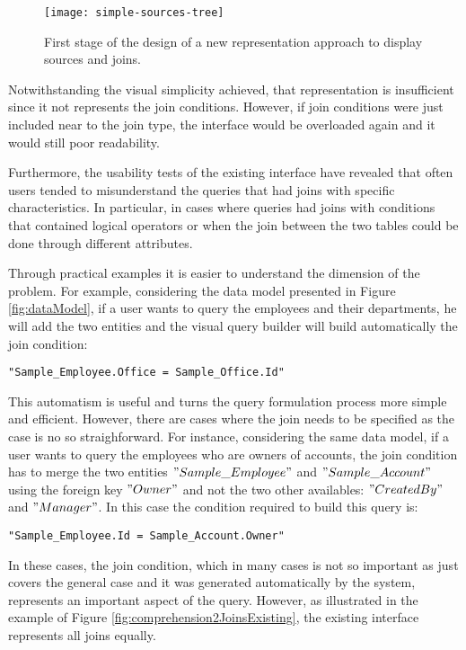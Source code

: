 \begin{figure}[htbp]
	\centering
	\texttt{[image: simple-sources-tree]}
	\caption{First stage of the design of a new representation approach to display sources and joins.}
	\label{fig:simpleSourcesTree}
\end{figure}

Notwithstanding the visual simplicity achieved, that representation is insufficient since it not represents the join conditions. However, if join conditions were just included near to the join type, the interface would be overloaded again and it would still poor readability.

Furthermore, the usability tests of the existing interface have revealed that often users tended to misunderstand the queries that had joins with specific characteristics. In particular, in cases where queries had joins with conditions that contained logical operators or when the join between the two tables could be done through different attributes.

Through practical examples it is easier to understand the dimension of the problem. For example, considering the data model presented in Figure \ref{fig:dataModel}, if a user wants to query the employees and their departments, he will add the two entities and the visual query builder will build automatically the join condition:

\begin{center}
  \verb|"Sample_Employee.Office = Sample_Office.Id"|
\end{center}

This automatism is useful and turns the query formulation process more simple and efficient. However, there are cases where the join needs to be specified as the case is no so straighforward. For instance, considering the same data model, if a user wants to query the employees who are owners of accounts, the join condition has to merge the two entities $"Sample\_Employee"$ and $"Sample\_Account"$ using the foreign key $"Owner"$ and not the two other availables: $"CreatedBy"$ and $"Manager"$. In this case the condition required to build this query is:

\begin{center}
  \verb|"Sample_Employee.Id = Sample_Account.Owner"|
\end{center}

In these cases, the join condition, which in many cases is not so important as just covers the general case and it was generated automatically by the system, represents an important aspect of the query. However, as illustrated in the example of Figure \ref{fig:comprehension2JoinsExisting}, the existing interface represents all joins equally.

